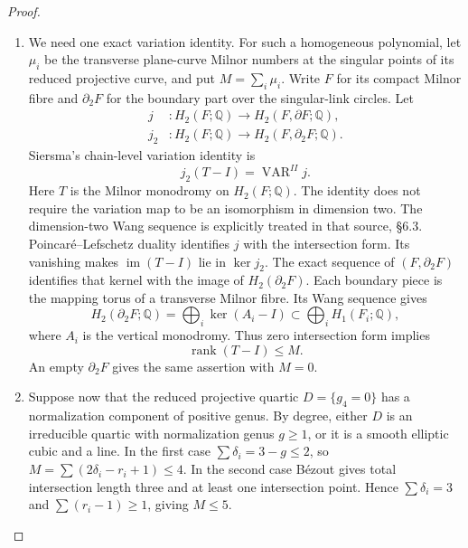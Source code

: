 \begin{proof}
\begin{enumerate}[label={$\langle1\rangle$\arabic*.},leftmargin=*]
\item We need one exact variation identity. For such a
homogeneous polynomial, let $\mu_i$ be the
transverse plane-curve Milnor numbers at the
singular points of its reduced projective curve,
and put $M=\sum_i\mu_i$. Write $F$ for its compact
Milnor fibre and $\partial_2F$ for the boundary
part over the singular-link circles. Let
\[
 \begin{split}
 j&:H_2(F;\mathbb Q)\longrightarrow
                         H_2(F,\partial F;\mathbb Q),\\
 j_2&:H_2(F;\mathbb Q)\longrightarrow
                         H_2(F,\partial_2F;\mathbb Q).
 \end{split}
\]
Siersma's chain-level variation identity
\cite[\S3.6, pp.~451--452; \S7.1, p.~462]
{Siersma1991Variation} is
\[
                 j_2(T-I)=\operatorname{VAR}^{II}j.
                                                            \tag{4.52a}
\]
Here $T$ is the Milnor monodromy on $H_2(F;\mathbb Q)$.
The identity does not require the variation map to
be an isomorphism in dimension two. The dimension-two
Wang sequence is explicitly treated in that source,
\S6.3. Poincar\'e--Lefschetz duality identifies $j$
with the intersection form. Its vanishing makes
$\operatorname{im}(T-I)$ lie in $\ker j_2$.
The exact sequence of $(F,\partial_2F)$ identifies
that kernel with the image of $H_2(\partial_2F)$.
Each boundary piece is the mapping torus of a
transverse Milnor fibre. Its Wang sequence gives
\[
 H_2(\partial_2F;\mathbb Q)
       =\bigoplus_i\ker(A_i-I)\subset
                        \bigoplus_iH_1(F_i;\mathbb Q),
\]
where $A_i$ is the vertical monodromy. Thus zero
intersection form implies
\[
                 \operatorname{rank}(T-I)\le M.             \tag{4.52b}
\]
An empty $\partial_2F$ gives the same assertion with
$M=0$.

\item Suppose now that the reduced projective quartic
$D=\{g_4=0\}$ has a normalization component of
positive genus. By degree, either $D$ is an
irreducible quartic with normalization genus
$g\ge1$, or it is a smooth elliptic cubic and a
line. In the first case
$\sum\delta_i=3-g\le2$, so
$M=\sum(2\delta_i-r_i+1)\le4$.
In the second case B\'ezout gives total intersection
length three and at least one intersection point.
Hence $\sum\delta_i=3$ and
$\sum(r_i-1)\ge1$, giving $M\le5$.


\end{enumerate}
\end{proof}
